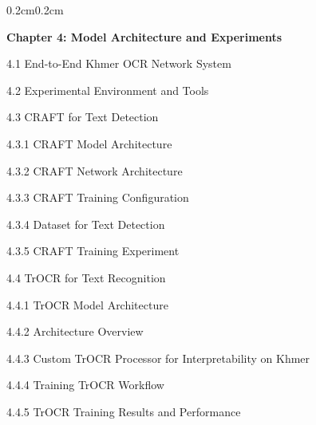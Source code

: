 {\begin{adjustwidth}{0.2cm}{0.2cm}
    \vspace{0.5cm}
    { \textbf{Chapter 4: Model Architecture and Experiments}\dotfill\pageref{ch:experiments}\par}
    { \hspace{0.5cm} 4.1 End-to-End Khmer OCR Network System\dotfill\pageref{sec:end_to_end_khmer_ocr_sysetm}\par}
    { \hspace{0.5cm} 4.2 Experimental Environment and Tools\dotfill\pageref{sec:environment}\par}
    { \hspace{0.5cm} 4.3 CRAFT for Text Detection\dotfill\pageref{sec:craft-complete}\par}
    { \hspace{1cm} 4.3.1 CRAFT Model Architecture\dotfill\pageref{subsec:craft-architecture}\par}
    { \hspace{1cm} 4.3.2 CRAFT Network Architecture\dotfill\pageref{subsec:craft-architecture-network}\par}
    { \hspace{1cm} 4.3.3 CRAFT Training Configuration\dotfill\pageref{subsec:craft-training-config}\par}
    { \hspace{1cm} 4.3.4 Dataset for Text Detection\dotfill\pageref{subsec:craft-dataset}\par}
    { \hspace{1cm} 4.3.5 CRAFT Training Experiment\dotfill\pageref{subsec:craft-training-results}\par}
    { \hspace{0.5cm} 4.4 TrOCR for Text Recognition\dotfill\pageref{sec:trocr-complete}\par}
    { \hspace{1cm} 4.4.1 TrOCR Model Architecture\dotfill\pageref{subsec:trocr-architecture}\par}
    { \hspace{1cm} 4.4.2 Architecture Overview\dotfill\pageref{subsec:trocr-architecture-overview}\par}
    { \hspace{1cm} 4.4.3 Custom TrOCR Processor for Interpretability on Khmer\dotfill\pageref{subsec:trocr-customization}\par}
    { \hspace{1cm} 4.4.4 Training TrOCR Workflow\dotfill\pageref{subsec:trocr-training}\par}
    { \hspace{1cm} 4.4.5 TrOCR Training Results and Performance\dotfill\pageref{subsec:trocr-training-results}\par}

\end{adjustwidth}}
